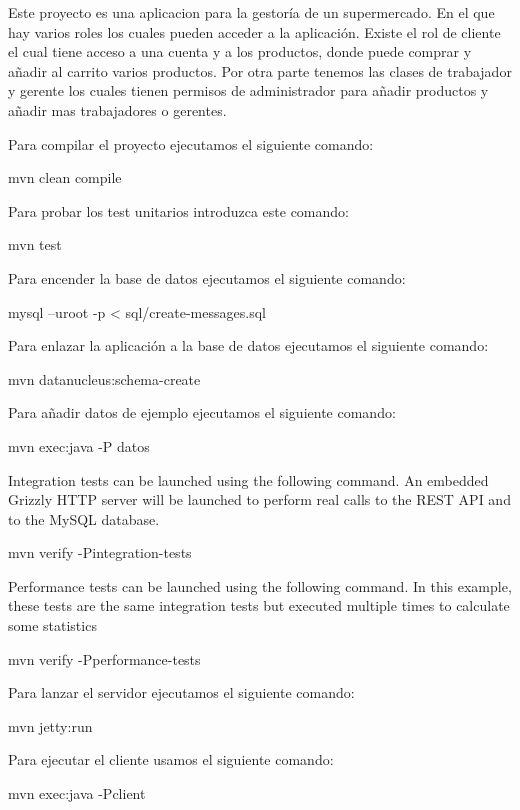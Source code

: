 Este proyecto es una aplicacion para la gestoría de un supermercado. En el que hay varios roles los cuales pueden acceder a la aplicación. Existe el rol de cliente el cual tiene acceso a una cuenta y a los productos, donde puede comprar y añadir al carrito varios productos. Por otra parte tenemos las clases de trabajador y gerente los cuales tienen permisos de administrador para añadir productos y añadir mas trabajadores o gerentes.

Para compilar el proyecto ejecutamos el siguiente comando\+: \begin{DoxyVerb}mvn clean compile
\end{DoxyVerb}


Para probar los test unitarios introduzca este comando\+: \begin{DoxyVerb}mvn test
\end{DoxyVerb}
 Para encender la base de datos ejecutamos el siguiente comando\+: \begin{DoxyVerb}mysql –uroot -p < sql/create-messages.sql
\end{DoxyVerb}
 Para enlazar la aplicación a la base de datos ejecutamos el siguiente comando\+: \begin{DoxyVerb}mvn datanucleus:schema-create
\end{DoxyVerb}
 Para añadir datos de ejemplo ejecutamos el siguiente comando\+: \begin{DoxyVerb}mvn exec:java -P datos
\end{DoxyVerb}
 Integration tests can be launched using the following command. An embedded Grizzly HTTP server will be launched to perform real calls to the REST API and to the My\+SQL database. \begin{DoxyVerb}mvn verify -Pintegration-tests
\end{DoxyVerb}
 Performance tests can be launched using the following command. In this example, these tests are the same integration tests but executed multiple times to calculate some statistics \begin{DoxyVerb}mvn verify -Pperformance-tests
\end{DoxyVerb}


Para lanzar el servidor ejecutamos el siguiente comando\+: \begin{DoxyVerb}mvn jetty:run
\end{DoxyVerb}
 Para ejecutar el cliente usamos el siguiente comando\+: \begin{DoxyVerb}mvn exec:java -Pclient
\end{DoxyVerb}


